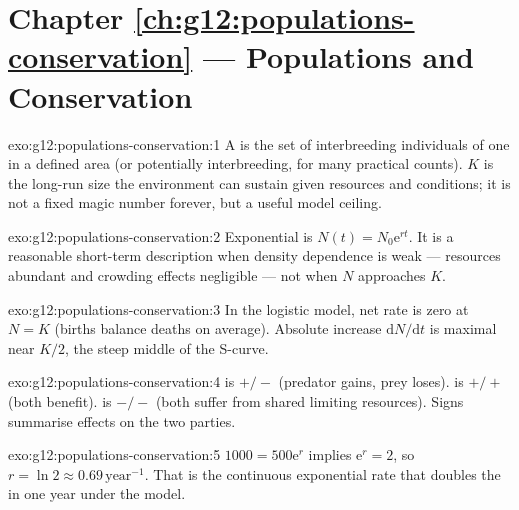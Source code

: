 \section*{Chapter \ref{ch:g12:populations-conservation} --- Populations and Conservation}

\begin{solution}{exo:g12:populations-conservation:1}
A  is the set of interbreeding individuals of one  in a
defined area (or potentially interbreeding, for many practical counts).
 $K$ is the long-run size the environment can sustain given
resources and conditions; it is not a fixed magic number forever, but a useful
model ceiling.
\end{solution}

\begin{solution}{exo:g12:populations-conservation:2}
Exponential  is $N(t)=N_0\mathrm{e}^{rt}$. It is a reasonable short-term
description when density dependence is weak --- resources abundant and crowding
effects negligible --- not when $N$ approaches $K$.
\end{solution}

\begin{solution}{exo:g12:populations-conservation:3}
In the logistic model, net   rate is zero at $N=K$ (births
balance deaths on average). Absolute increase $\mathrm{d}N/\mathrm{d}t$ is
maximal near $K/2$, the steep middle of the S-curve.
\end{solution}

\begin{solution}{exo:g12:populations-conservation:4}
 is $+/-$ (predator gains, prey loses).  is $+/+$ (both
benefit).  is $-/-$ (both suffer from shared limiting resources).
Signs summarise  effects on the two parties.
\end{solution}

\begin{solution}{exo:g12:populations-conservation:5}
$1000=500\mathrm{e}^{r}$ implies $\mathrm{e}^{r}=2$, so
$r=\ln 2\approx 0.69\,\mathrm{year}^{-1}$. That is the continuous exponential
 rate that doubles the  in one year under the model.
\end{solution}

